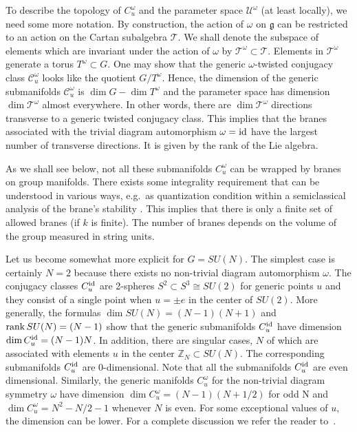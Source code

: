 \documentclass[12pt,a4paper]{article}
\newcommand{\mf}{\mathfrak} %
\def\U{{\mathcal U}}
\def\id{{\rm id}}
\def\st{{\mathcal T}}
\def\C{{\mathcal C}}
\def\rank{{\rm rank\,}}
\def\QZ{\mathbb{Z}}
\def\bZ{\QZ}
\begin{document}
To describe the topology of $C^\omega_u$ and the parameter 
space $\U^\omega$ (at least locally), we need some more 
notation. By construction, the action of $\omega$ on 
$\mf{g}$ can be restricted to an action on the Cartan subalgebra $\st$. 
We shall denote the subspace of elements which are invariant 
under the action of $\omega$ by $\st^\omega \subset \st$. 
Elements in $\st^\omega$ generate a torus $T^\omega \subset G$. 
One may show that the generic $\omega$-twisted conjugacy class
$\C^\omega_u$ looks like the quotient $G/T^\omega$. Hence, 
the dimension of the generic submanifolds $\C^\omega_u$ 
is $\dim G - \dim T^\omega$ and the parameter space has
dimension $\dim \st^\omega$ almost everywhere.
In other words, there are $\dim \st^\omega$ 
directions transverse to a generic twisted conjugacy 
class. This implies that the branes associated with the 
trivial diagram automorphism $\omega = \id$ have the largest 
number of transverse directions. It is given by the rank of 
the Lie algebra. 
\smallskip 

As we shall see below, not all these submanifolds $C^\omega_u$ 
can be wrapped by branes on group manifolds. There exists some 
integrality requirement that can be understood in various ways, 
e.g.\ as quantization condition within a semiclassical analysis 
\cite{Alekseev:1998mc} of the brane's stability 
\cite{Bachas:2000ik, Pawelczyk:2000ah, Bordalo:2001ec}.
This implies that there is only a finite set of 
allowed branes (if $k$ is finite). The number of branes depends 
on the volume of the group measured in string units. 
\smallskip

Let us become somewhat more explicit for $G = SU(N)$. The 
simplest case is certainly $N=2$ because there exists no 
non-trivial diagram automorphism $\omega$. The conjugacy 
classes $C^\id_u$ are 2-spheres $S^2 \subset S^3 \cong 
SU(2)$ for generic points $u$ and they consist of a 
single point when $u = \pm e$ in the center of $SU(2)$.  
More generally, the formulas $\dim SU(N) = (N-1)(N+1)$ and 
$\rank SU(N) = (N-1)$ show that the generic submanifolds 
$C^\id_u$ have dimension $\dim C^\id_u = (N-1)N$.
In addition, there are singular cases, $N$ of which are associated
with elements $u$ in the center $\bZ_N \subset SU(N)$. The 
corresponding submanifolds $C^\id_u$ are 0-dimensional. 
Note that all the submanifolds $C^\id_u$ are even 
dimensional. Similarly, the generic manifolds $C^\omega_u$ 
for the non-trivial diagram symmetry $\omega$ have 
dimension $\dim C^\omega_u = (N-1)(N+1/2)$ for odd N 
and $\dim C^\omega_u = N^{2}-N/2-1$ whenever 
$N$ is even. For some exceptional values of 
$u$, the dimension can be lower.
For a complete discussion we refer the reader
to~\cite{Stanciu:2001vw}.
\medskip
\end{document}

